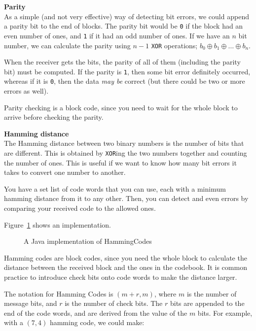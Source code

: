 \begin{description}
  \item \textbf{Parity}\\
    As a simple (and not very effective) way of detecting bit errors, we could
    append a parity bit to the end of blocks. The parity bit would be \texttt{0}
    if the block had an even number of ones, and \texttt{1} if it had an odd
    number of ones. If we have an $n$ bit number, we can calculate the parity
    using $n - 1$ \texttt{XOR} operations; $b_0 \oplus b_1 \oplus \dots \oplus
    b_n$.

    When the receiver gets the bits, the parity of all of them (including the
    parity bit) must be computed. If the parity is \texttt{1}, then some bit
    error definitely occurred, whereas if it is \texttt{0}, then the data
    \textit{may be} correct (but there could be two or more errors as well).

    Parity checking is a block code, since you need to wait for the whole block
    to arrive before checking the parity.
  \item \textbf{Hamming distance}\\
    The Hamming distance between two binary numbers is the number of bits that
    are different. This is obtained by \texttt{XOR}ing the two numbers together
    and counting the number of ones. This is useful if we want to know how many
    bit errors it takes to convert one number to another.

    You have a set list of code words that you can use, each with a minimum
    hamming distance from it to any other. Then, you can detect and even errors
    by comparing your received code to the allowed ones.

    Figure~\ref{HammingCodes} shows an implementation.

    \begin{figure}
      
      \label{HammingCodes}
      \caption{A Java implementation of HammingCodes}
    \end{figure}

    Hamming codes are block codes, since you need the whole block to calculate
    the distance between the received block and the ones in the codebook. It is
    common practice to introduce check bits onto code words to make the distance
    larger.

    The notation for Hamming Codes is $(m+r, m)$, where $m$ is the number of
    message bits, and $r$ is the number of check bits. The $r$ bits are appended
    to the end of the code words, and are derived from the value of the $m$
    bits. For example, with a $(7,4)$ hamming code, we could make:


\end{description}
